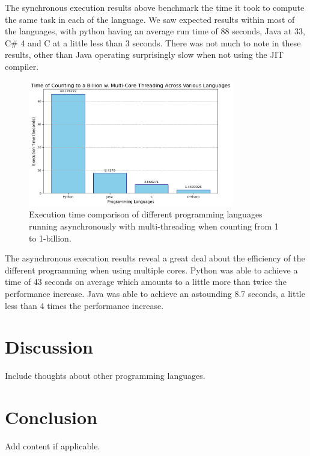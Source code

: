 \documentclass[12pt,a4paper]{article}
\begin{document}
The synchronous execution results above benchmark the time it took to compute the same task in each of the language. We saw expected results within most of the languages, with python having an average run time of 88 seconds, Java at 33, C\# 4 and C at a little less than 3 seconds. There was not much to note in these results, other than Java operating surprisingly slow when not using the JIT compiler.


\begin{figure}[!htb]
    \centering
    \includegraphics[width=0.8\textwidth]{../async_records/async_exec_times.png}
    \captionsetup{font=tiny, justification=centering}
    \caption{Execution time comparison of different programming languages running asynchronously with multi-threading when counting from 1 to 1-billion.}
    \label{fig:async-exec-times}
\end{figure}

The asynchronous execution results reveal a great deal about the efficiency of the different programming when using multiple cores. Python was able to achieve a time of 43 seconds on average which amounts to a little more than twice the performance increase. Java was able to achieve an astounding 8.7 seconds, a little less than 4 times the performance increase.

\newpage
\section{Discussion}

Include thoughts about other programming languages.

\newpage
\section{Conclusion}

Add content if applicable.
\end{document}
